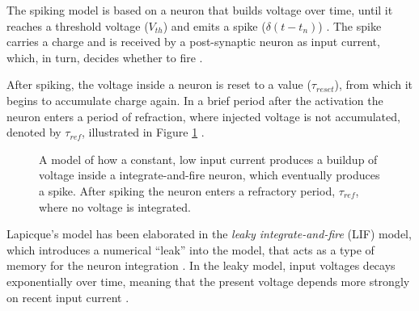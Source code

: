 \documentclass[report.tex]{subfiles}
\begin{document}
The spiking model is based on a neuron that builds voltage over time, until
it reaches a threshold voltage ($V_{th}$) and emits a spike
\mbox{($\delta(t-t_n)$)}
\cite{Dayan2001, Eliasmith2004}.
The spike carries a charge and is received by a post-synaptic neuron as
input current, which, in turn, decides whether to fire \cite{Dayan2001}.

After spiking, the voltage inside a neuron is reset to a value ($\tau_{reset}$),
from which it begins to accumulate charge again.
In a brief period after the activation the neuron enters a period of
refraction, 
where injected voltage is not accumulated, denoted by 
$\tau_{ref}$, illustrated in Figure \ref{fig:spiking}
\cite[p. 82]{Eliasmith2004}.

\begin{figure}
\centering

\caption{A model of how a constant, low input current produces a buildup of
	voltage inside a integrate-and-fire neuron, which eventually produces a spike.
	After spiking the neuron enters a refractory period, $\tau_{ref}$,
   	where no voltage is integrated.}
\label{fig:spiking}
\end{figure}

Lapicque's model has been elaborated in the \textit{leaky
integrate-and-fire} (LIF) 
model, which introduces a numerical ``leak''
into the model, that acts as a type of memory 
for the neuron integration \cite{Eliasmith2004, Eliasmith2015}.
In the leaky model, input voltages decays exponentially over time,
meaning that the present voltage depends more strongly on recent input
current \cite[p. 85]{Eliasmith2004}.
\end{document}
